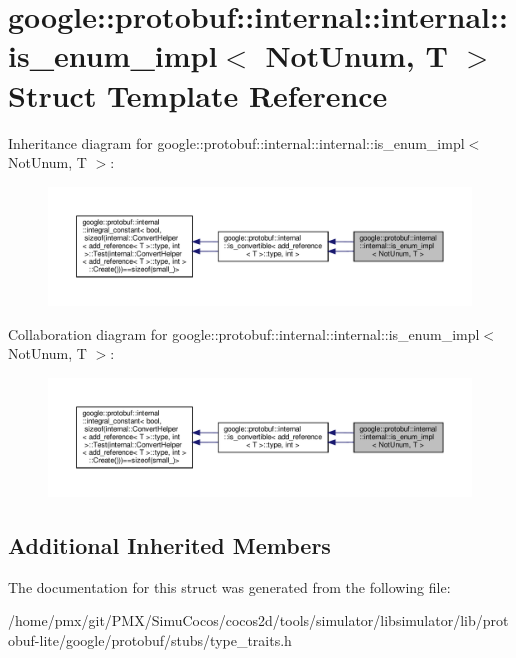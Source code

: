 \hypertarget{structgoogle_1_1protobuf_1_1internal_1_1internal_1_1is__enum__impl}{}\section{google\+:\+:protobuf\+:\+:internal\+:\+:internal\+:\+:is\+\_\+enum\+\_\+impl$<$ Not\+Unum, T $>$ Struct Template Reference}
\label{structgoogle_1_1protobuf_1_1internal_1_1internal_1_1is__enum__impl}


Inheritance diagram for google\+:\+:protobuf\+:\+:internal\+:\+:internal\+:\+:is\+\_\+enum\+\_\+impl$<$ Not\+Unum, T $>$\+:
\nopagebreak
\begin{figure}[H]
\begin{center}
\leavevmode
\includegraphics[width=350pt]{structgoogle_1_1protobuf_1_1internal_1_1internal_1_1is__enum__impl__inherit__graph}
\end{center}
\end{figure}


Collaboration diagram for google\+:\+:protobuf\+:\+:internal\+:\+:internal\+:\+:is\+\_\+enum\+\_\+impl$<$ Not\+Unum, T $>$\+:
\nopagebreak
\begin{figure}[H]
\begin{center}
\leavevmode
\includegraphics[width=350pt]{structgoogle_1_1protobuf_1_1internal_1_1internal_1_1is__enum__impl__coll__graph}
\end{center}
\end{figure}
\subsection*{Additional Inherited Members}


The documentation for this struct was generated from the following file\+:\begin{DoxyCompactItemize}
\item 
/home/pmx/git/\+P\+M\+X/\+Simu\+Cocos/cocos2d/tools/simulator/libsimulator/lib/protobuf-\/lite/google/protobuf/stubs/type\+\_\+traits.\+h\end{DoxyCompactItemize}
